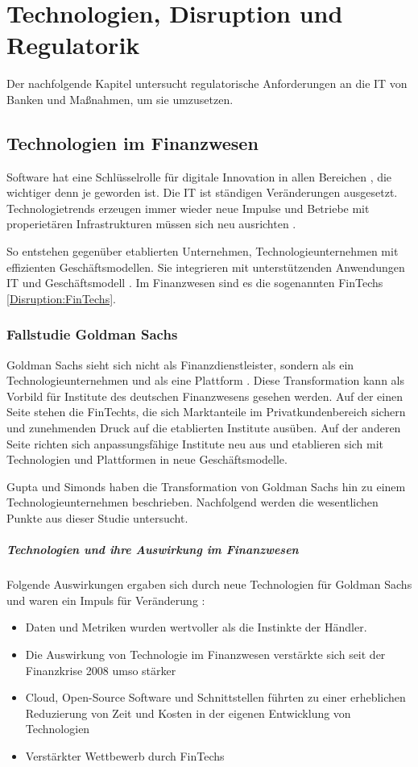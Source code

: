\chapter{Technologien, Disruption und Regulatorik}
\label{ch:background}
Der nachfolgende Kapitel untersucht regulatorische Anforderungen an die IT von Banken und Maßnahmen, um sie umzusetzen.
%

\section{Technologien im Finanzwesen}
Software hat eine Schlüsselrolle für digitale Innovation in allen Bereichen \cite{Alt2017}, die wichtiger denn je geworden ist. Die IT ist ständigen Veränderungen ausgesetzt. Technologietrends erzeugen immer wieder neue Impulse und Betriebe mit properietären Infrastrukturen müssen sich neu ausrichten \cite{Bussmann2006}.

So entstehen gegenüber etablierten Unternehmen, Technologieunternehmen mit effizienten Geschäftsmodellen. Sie integrieren mit unterstützenden Anwendungen IT und Geschäftsmodell \cite{Bussmann2006}. Im Finanzwesen sind es die sogenannten FinTechs \ref{Disruption:FinTechs}.

\subsection{Fallstudie Goldman Sachs}
Goldman Sachs sieht sich nicht als Finanzdienstleister, sondern als ein Technologieunternehmen und als eine Plattform \cite{Gupta:2017}. Diese Transformation kann als Vorbild für Institute des deutschen Finanzwesens gesehen werden. Auf der einen Seite stehen die FinTechts, die sich Marktanteile im Privatkundenbereich sichern und zunehmenden Druck auf die etablierten Institute ausüben. Auf der anderen Seite richten sich anpassungsfähige Institute neu aus und etablieren sich mit Technologien und Plattformen in neue Geschäftsmodelle. 

Gupta und Simonds \cite{Gupta:2017} haben die Transformation von Goldman Sachs hin zu einem Technologieunternehmen beschrieben. Nachfolgend werden die wesentlichen Punkte aus dieser Studie untersucht.
%
\paragraph{Technologien und ihre Auswirkung im Finanzwesen}
Folgende Auswirkungen ergaben sich durch neue Technologien für Goldman Sachs und waren ein Impuls für Veränderung \cite{Gupta:2017}:
\begin{itemize}
    \item Daten und Metriken wurden wertvoller als die Instinkte der Händler.
    \item Die Auswirkung von Technologie im Finanzwesen verstärkte sich seit der Finanzkrise 2008 umso stärker
    \item Cloud, Open-Source Software und Schnittstellen führten zu einer erheblichen Reduzierung von Zeit und Kosten in der eigenen Entwicklung von Technologien
    \item Verstärkter Wettbewerb durch FinTechs
\end{itemize}

